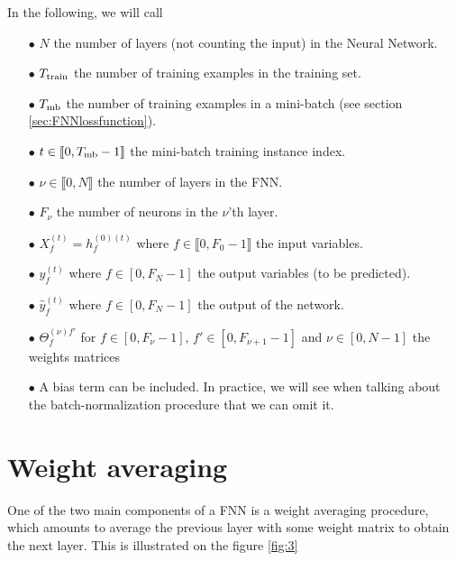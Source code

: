 In the following, we will call
\begin{itemize}
\item[$\bullet$] $N$ the number of layers (not counting the input) in the Neural Network.
\item[$\bullet$] $T_{{\rm train}}$ the number of training examples in the training set.
\item[$\bullet$] $T_{{\rm mb}}$ the number of training examples in a mini-batch (see section \ref{sec:FNNlossfunction}). 
\item[$\bullet$] $t \in \llbracket0,T_{{\rm mb}}-1\rrbracket$ the mini-batch training instance index.
\item[$\bullet$] $\nu\in\llbracket0,N\rrbracket$ the number of layers in the FNN.  
\item[$\bullet$] $F_\nu$ the number of neurons in the $\nu$'th layer.
\item[$\bullet$] $X^{(t)}_f=h_{f}^{(0)(t)}$ where $f\in\llbracket0,F_0-1\rrbracket$ the input variables. 
\item[$\bullet$] $y^{(t)}_f$ where  $f\in[0,F_N-1]$ the output variables (to be predicted). 
\item[$\bullet$] $\hat{y}^{(t)}_f$ where  $f\in[0,F_N-1]$ the output of the network. 
\item[$\bullet$] $\Theta_{f}^{(\nu)f'}$ for $f\in [0,F_{\nu}-1]$, $f'\in [0,F_{\nu+1}-1]$ and $\nu\in[0,N-1]$ the weights matrices
\item[$\bullet$] A bias term can be included. In practice, we will see when talking about the batch-normalization procedure that we can omit it.
\end{itemize}


\section{Weight averaging}


One of the two main components of a FNN is a weight averaging procedure, which amounts to average the previous layer with some weight matrix to obtain the next layer. This is illustrated on the figure \ref{fig:3}



